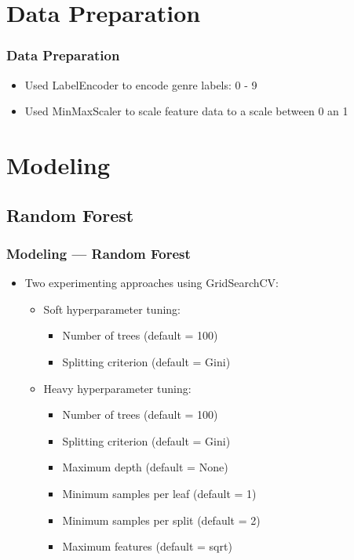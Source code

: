 \documentclass[10pt, aspectratio=169]{beamer}
\begin{document}
\section{Data Preparation}
\begin{frame}
    \frametitle{Data Preparation}
    \begin{itemize}\setlength\itemsep{12pt}
        \item Used LabelEncoder to encode genre labels: 0 - 9
        \item Used MinMaxScaler to scale feature data to a scale between 0 an 1
    \end{itemize}
\end{frame}

\section{Modeling}
\subsection{Random Forest}
\begin{frame}
    \frametitle{Modeling --- Random Forest}
    \begin{itemize}
        \item Two experimenting approaches using GridSearchCV:
        \begin{itemize}
            \item Soft hyperparameter tuning:
            \begin{itemize}
                \item Number of trees (default = 100)
                \item Splitting criterion (default = Gini)
            \end{itemize}
            \item Heavy hyperparameter tuning:
            \begin{itemize}
                \item Number of trees (default = 100)
                \item Splitting criterion (default = Gini)
                \item Maximum depth (default = None)
                \item Minimum samples per leaf (default = 1)
                \item Minimum samples per split (default = 2)
                \item Maximum features (default = sqrt)
            \end{itemize}
        \end{itemize}
    \end{itemize}
\end{frame}
\end{document}
